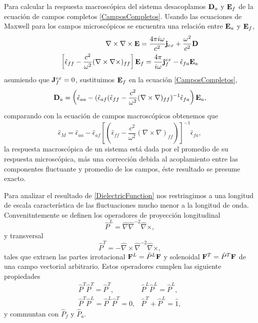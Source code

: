 \documentclass[12pt]{article}
\begin{document}
Para calcular la respuesta macroscópica del sistema desacoplamos
${\bf D}_{a}$ y ${\bf E}_{f}$ de la ecuación de campos completos
\eqref{CamposCompletos}. Usando las ecuaciones de Maxwell para
los campos microscópicos se encuentra una relación entre ${\bf E}_{a}$
y ${\bf E}_{f}$,
\begin{equation}
  \begin{split}
      \nabla \times \nabla \times {\bf E} = \frac{4\pi
        i\omega}{c^{2}}{\bf j}_{ex} + \frac{\omega^{2}}{c^{2}}{\bf D}
      \\ \left[ \hat{\epsilon}_{ff} - \frac{c^{2}}{\omega^{2}}(\nabla
        \times \nabla \times)_{ff}\right] {\bf E}_{f} = \frac{4\pi}{i
        \omega }{\bf j}_{f}^{ex}-\hat{\epsilon}_{fa}{\bf E}_{a}
  \end{split}
\end{equation}
asumiendo que ${\bf J}^{ex}_{f} = 0 $, sustituimos ${\bf E}_{f}$ en la
ecuación \eqref{CamposCompletos},
\begin{equation}
  {\bf
    D}_{a}=\left(\hat{\epsilon}_{aa}-(\hat{\epsilon}_{af}(\hat{\epsilon}_{ff}-\frac{c^{2}}{\omega^{2}}(\nabla
  \times \nabla)_{ff})^{-1}\hat{\epsilon}_{fa}\right){\bf E}_{a},
  \label{MacroscopicRelation}
\end{equation}
comparando con la ecuación de campos macroscópicos obtenemos que
\begin{equation}
  \hat{\epsilon}_{M}=\hat{\epsilon}_{aa}-\hat{\epsilon}_{af}\left[(\hat{\epsilon}_{ff}-\frac{c^{2}}{\omega^{2}}(\nabla
    \times \nabla)_{ff})\right]^{-1}\hat{\epsilon}_{fa},
  \label{DielectricFunction}
\end{equation}
la respuesta macroscópica de un sistema está dada por el promedio de
su respuesta microscópica, más una corrección debida al acoplamiento
entre las componentes fluctuante y promedio de los campos, éste
resultado se presume exacto.

Para analizar el resultado de \eqref{DielectricFunction} nos
restringimos a una longitud de escala característica de las
fluctuaciones mucho menor a la longitud de onda. Convenitntemente se
definen los operadores de proyección longitudinal
\begin{equation}
  \hat{P}^{L} = \hat{\nabla} \hat{\nabla}^{-2} \hat{\nabla}\times,
\end{equation}
y transversal
\begin{equation}
  \hat{P}^{T}=-\hat{\nabla}\times \hat{\nabla}^{-2} \hat{\nabla}\times,
\end{equation}
tales que extraen las partes irrotacional ${\bf F}^{L}=\hat{P}^{L}{\bf
  F} $ y solenoidal ${\bf F}^{T}=\hat{P}^{T}{\bf F}$ de una campo
vectorial arbitrario. Estos operadores cumplen las siguiente
propiedades
\begin{equation}
  \begin{array}{cc}
    \hat{P}^{T}\hat{P}^{T}=\hat{P}^{T}, & \hat{P}^{L}\hat{P}^{L}=\hat{P}^{L},\\
    \hat{P}^{T}\hat{P}^{L}=\hat{P}^{L}\hat{P}^{T}=0, & \hat{P}^{T}+\hat{P}^{L}=\hat{1},
  \end{array}
\end{equation}
y communtan con $\hat{P}_{f}$ y $\hat{P}_{a}$.
\end{document}
